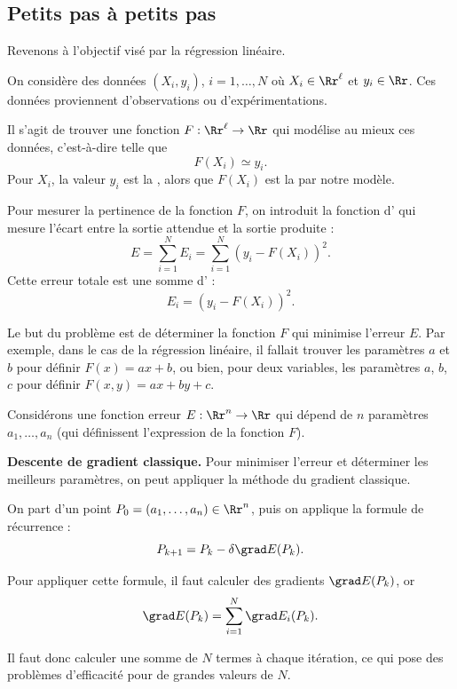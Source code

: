 \documentclass[10pt,class=report,crop=false]{standalone}
\begin{document}
\subsection{Petits pas à petits pas}

Revenons à l'objectif visé par la régression linéaire.

On considère des données $(X_i,y_i)$, $i=1,\ldots,N$ où $X_i \in \Rr^\ell$ et $y_i \in \Rr$.
Ces données proviennent d'observations ou d'expérimentations. 

Il s'agit de trouver une fonction $F : \Rr^\ell \to \Rr $ qui modélise au mieux ces données, c'est-à-dire telle que 
$$F(X_i) \simeq y_i.$$
Pour  $X_i$, la valeur $y_i$ est la , alors que $F(X_i)$ est la  par notre modèle. 

Pour mesurer la pertinence de la fonction $F$, on introduit la fonction d' qui mesure l'écart entre la sortie attendue et la sortie produite :
$$E = \sum_{i=1}^N E_i =  \sum_{i=1}^N(y_i - F(X_i))^2.$$
Cette erreur totale est une somme d' :
$$E_i =  (y_i - F(X_i))^2.$$

Le but du problème est de déterminer la fonction $F$ qui minimise l'erreur $E$.
Par exemple, dans le cas de la régression linéaire, il fallait trouver les paramètres $a$ et $b$ pour définir $F(x) = ax+b$, ou bien, pour deux variables, les paramètres $a$, $b$, $c$ pour définir $F(x,y) = ax+by+c$.

Considérons une fonction erreur $E : \Rr^n \to \Rr$ qui dépend de $n$ paramètres $a_1,\ldots,a_n$ (qui définissent l'expression de la fonction $F$). 

\bigskip

\textbf{Descente de gradient classique.}
Pour minimiser l'erreur et déterminer les meilleurs paramètres, on peut appliquer la méthode du gradient classique.

On part d'un point $P_0 = (a_1,\ldots,a_n) \in \Rr^n$, puis on applique la formule de récurrence :
$$P_{k+1} = P_k - \delta \grad E (P_k).$$


Pour appliquer cette formule, il faut calculer des gradients $\grad E(P_k)$, or
$$\grad E(P_k) = \sum_{i=1}^N \grad E_i(P_k).$$

Il faut donc calculer une somme de $N$ termes à chaque itération, ce qui pose des problèmes d'efficacité pour de grandes valeurs de $N$.

\bigskip
\end{document}
